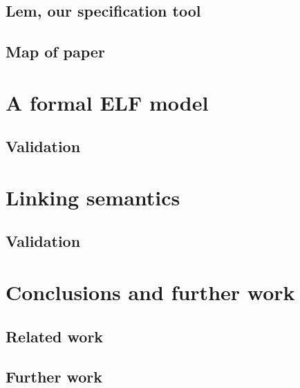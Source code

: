 \documentclass[preprint, natbib, 10pt]{sigplanconf-pldi15}
\begin{document}
\subsection{Lem, our specification tool}
\label{subsect.lem.our.specification.tool}

\subsection{Map of paper}
\label{subsect.map.of.paper}

\section{A formal ELF model}
\label{sect.formal.elf.model}

\subsection{Validation}
\label{subsect.elf.validation}

\section{Linking semantics}
\label{sect.linking.semantics}

\subsection{Validation}
\label{subsect.linking.validation}

\section{Conclusions and further work}
\label{sect.conclusions.and.further.work}

\subsection{Related work}
\label{subsect.related.work}

\subsection{Further work}
\label{subsect.further.work}


\end{document}
